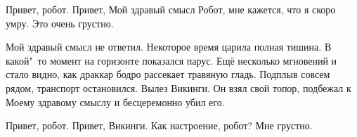 \begin{dialog}
\X Привет, робот.
\R Привет, Мой здравый смысл
\X Робот, мне кажется, что я скоро умру.
\R Это очень грустно.
\end{dialog}

\begin{monolog}
Мой здравый смысл не ответил. Некоторое время царила полная тишина. В какой"~то момент на горизонте показался парус. Ещё несколько мгновений и стало видно, как драккар бодро рассекает травяную гладь. Подплыв совсем рядом, транспорт остановился. Вылез Викинги. Он взял свой топор, подбежал к Моему здравому смыслу и бесцеремонно убил его.
\end{monolog}

\begin{dialog}
\X Привет, робот.
\R Привет, Викинги.
\X Как настроение, робот?
\R Мне грустно.
\end{dialog}